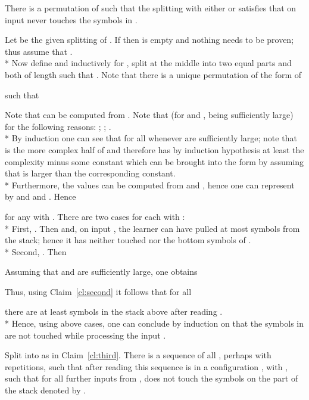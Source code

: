 \documentclass{LMCS}
\theoremstyle{plain}\newtheorem{athm}[thm]{Theorem}
\theoremstyle{plain}\newtheorem{aprop}[thm]{Proposition}
\theoremstyle{plain}\newtheorem{aprob}[thm]{Open Problem}
\theoremstyle{plain}\newtheorem{acor}[thm]{Corollary}
\theoremstyle{plain}\newtheorem{alem}[thm]{Lemma}
\theoremstyle{definition}\newtheorem{adefn}[thm]{Definition}
\theoremstyle{definition}\newtheorem{arem}[thm]{Remark}
\theoremstyle{plain}\newtheorem{aexmp}[thm]{Example}
\theoremstyle{plain}\newtheorem{aclm}[thm]{Claim}
\def\sp{\\*\indent}
\begin{document}
\begin{clm} \label{cl:third}
There is a permutation  of
 such that the splitting  with
either  or 
satisfies that  on input 
never touches the symbols in .
\end{clm}

\noindent
Let  be the given splitting of .
If  then  is empty and nothing needs to be proven;
thus assume that .
\sp
Now define 
and inductively for , split  at the
middle into two equal parts  and  
both of length  such that
. Note
that there is a unique permutation
of the form  of

such that

Note that  can be computed from .
Note that  
(for  and ,  being sufficiently large)
for the following reasons:
;
;
.
\sp
By induction one can see that
 for all 
whenever  are sufficiently large; note that  is the more
complex half of  and therefore has by induction hypothesis
at least the complexity 
minus some constant
which can be brought into the form  by
assuming that  is larger than the corresponding constant.
\sp
Furthermore, the values  can be computed from  and
, hence one can represent 
by  and  and . Hence

for any  with .
There are two cases for each  with :
\sp
First, . Then  and,
on input , the learner
can have pulled at most  symbols
from the stack; hence it has neither touched  nor the bottom
 symbols of .
\sp
Second, . Then 

Assuming that  and  are sufficiently large, one obtains

Thus, using Claim~\ref{cl:second} it follows that for all 
 
there are at least  symbols in the stack above  after reading
.
\sp
Hence, using above cases, one can conclude by induction on  that the
symbols in  are not touched while processing the input
.

\begin{clm} \label{cl:fourth}
Split  into  as in Claim~\ref{cl:third}. There is a sequence
of all , perhaps with repetitions, such that after reading this
sequence  is in a configuration , with , 
such that for all further
inputs from ,  does not touch the symbols on the
part of the stack denoted by .
\end{clm}
\end{document}

